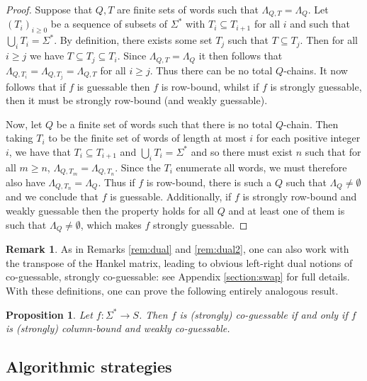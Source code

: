 \documentclass[10pt,a4paper]{amsart}
\newtheorem{prop}[thm]{Proposition}
\theoremstyle{definition}
\newtheorem{rem}[thm]{Remark}
\numberwithin{equation}{section}
\numberwithin{theorem}{section}
\begin{document}
\begin{proof} Suppose that $Q, T$ are finite sets of words such that $\Lambda_{Q, T}=\Lambda_{Q}$. Let $(T_i)_{i \geq0}$ be a sequence of subsets of $\Sigma^*$ with $T_i \subseteq T_{i+1}$ for all $i$ and such that $\bigcup_i T_i = \Sigma^*$. By definition, there exists some set $T_j$ such that $T \subseteq T_j$. Then for all $i\geq j$ we have $T \subseteq T_j \subseteq T_i$. Since $\Lambda_{Q, T}=\Lambda_{Q}$ it then follows that $\Lambda_{Q, T_i} = \Lambda_{Q, T_j} = \Lambda_{Q, T}$ for all $i \geq j$. Thus there can be no total $Q$-chains. It now follows that if $f$ is guessable then $f$ is row-bound, whilst if $f$ is strongly guessable, then it must be strongly row-bound (and weakly guessable).
	
	Now, let $Q$ be a finite set of words such that there is no total $Q$-chain. Then taking $T_i$ to be the finite set of words of length at most $i$  for each positive integer $i$, we have that $T_i \subseteq T_{i+1}$ and $\bigcup_i T_i = \Sigma^*$ and so there must exist $n$ such that for all $m\geq n$, $\Lambda_{Q, T_m} = \Lambda_{Q, T_n}$. Since the $T_i$ enumerate all words, we must therefore also have $\Lambda_{Q, T_n} = \Lambda_{Q}$.  Thus if $f$ is row-bound, there is such a $Q$ such that $\Lambda_Q \neq \emptyset$ and we conclude that $f$ is guessable. Additionally, if $f$ is strongly row-bound and weakly guessable then the property holds for all $Q$ and at least one of them is such that $\Lambda_Q \neq \emptyset$, which makes $f$ strongly guessable.
\end{proof} %


\begin{rem}
\label{rem:dual3}
As in Remarks \ref{rem:dual} and \ref{rem:dual2}, one can also work with the transpose of the Hankel matrix, leading to obvious left-right dual notions of co-guessable, strongly co-guessable: see Appendix \ref{section:swap} for full details. With these definitions, one can prove the following entirely analogous result.
\end{rem}



\begin{prop}
	\label{prop:coguessable}
	Let $f:\Sigma^* \to S$. Then $f$ is (strongly) co-guessable if and only if $f$ is (strongly) column-bound and weakly co-guessable.  
\end{prop}


\subsection{Algorithmic strategies}
\end{document}

